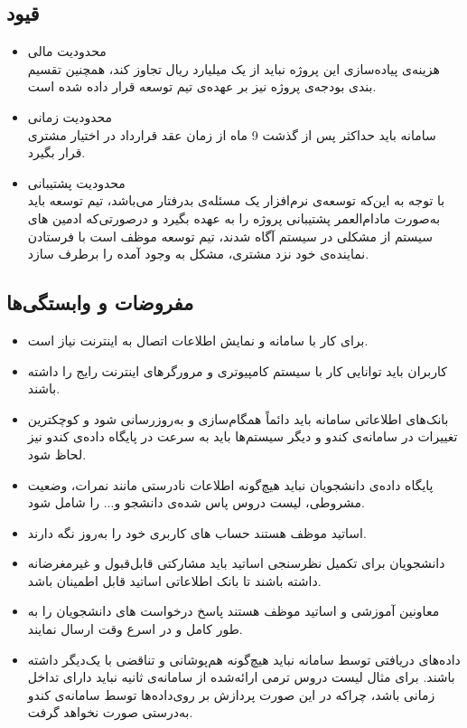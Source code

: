 \documentclass{report}
\begin{document}
\subsection{قیود}
\begin{itemize}
\item{}
محدودیت مالی
\\
\hypertarget{tt}{هزینه‌ی}
پیاده‌سازی این پروژه نباید از یک میلیارد ریال تجاوز کند، همچنین تقسیم بندی بودجه‌ی پروژه نیز بر عهده‌ی تیم توسعه قرار داده شده است.
\item 
{}محدودیت زمانی
\\
سامانه باید حداکثر پس از گذشت 9 ماه از زمان عقد قرارداد در اختیار مشتری قرار بگیرد.
\item {}محدودیت پشتیبانی
\\
با توجه به این‌که توسعه‌ی نرم‌افزار یک مسئله‌ی بدرفتار می‌باشد، تیم توسعه باید به‌صورت مادام‌العمر پشتیبانی پروژه را به عهده بگیرد و درصورتی‌که ادمین های سیستم از مشکلی در سیستم آگاه شدند، تیم توسعه موظف است با فرستادن نماینده‌ی خود نزد مشتری، مشکل به وجود آمده را برطرف سازد.
\end{itemize}
\subsection{مفروضات و وابستگی‌ها}
\begin{itemize}
\item 
برای کار با سامانه و نمایش اطلاعات اتصال به اینترنت نیاز است. 
\item
  کاربران باید توانایی کار با سیستم کامپیوتری و مرورگرهای اینترنت رایج را داشته باشند.
\item
بانک‌های اطلاعاتی سامانه باید دائماً همگام‌سازی
 و به‌روزرسانی شود و کوچکترین تغییرات در سامانه‌ی کندو و دیگر سیستم‌ها باید به سرعت در پایگاه داده‌ی کندو نیز لحاظ شود.
\item
پایگاه داده‌ی دانشجویان نباید هیچ‌گونه اطلاعات نادرستی مانند نمرات، وضعیت مشروطی، لیست دروس پاس شده‌ی دانشجو و... را شامل شود.
\item
اساتید موظف هستند حساب های کاربری خود را به‌روز نگه دارند.
\item
دانشجویان برای تکمیل نظرسنجی اساتید باید مشارکتی قابل‌قبول و غیرمغرضانه داشته باشند تا بانک اطلاعاتی اساتید قابل اطمینان باشد.
\item
معاونین آموزشی و اساتید موظف هستند پاسخ درخواست های دانشجویان را به طور کامل و در اسرع وقت ارسال نمایند.
\item
داده‌های دریافتی توسط سامانه نباید هیچ‌گونه هم‌پوشانی و تناقضی با یک‌دیگر داشته باشند. برای مثال لیست دروس ترمی ارائه‌شده از سامانه‌ی ثانیه نباید دارای تداخل زمانی باشد، چراکه در این صورت پردازش بر روی‌داده‌ها توسط سامانه‌ی کندو به‌درستی صورت نخواهد گرفت.
\end{itemize}
\end{document}
